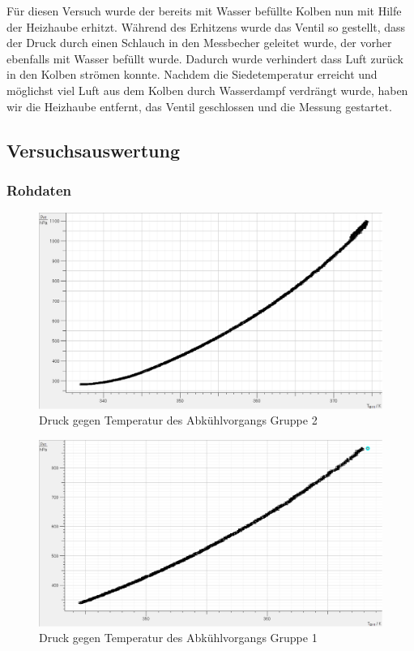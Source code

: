 \documentclass[12pt,a4paper]{article}
\begin{document}
Für diesen Versuch wurde der bereits mit Wasser befüllte Kolben nun mit Hilfe der Heizhaube erhitzt. Während des Erhitzens wurde das Ventil so gestellt, dass der Druck durch einen Schlauch in den Messbecher geleitet wurde, der vorher ebenfalls mit Wasser befüllt wurde. Dadurch wurde verhindert dass Luft zurück in den Kolben strömen konnte.
Nachdem die Siedetemperatur erreicht und möglichst viel Luft aus dem Kolben durch Wasserdampf verdrängt wurde, haben wir die Heizhaube entfernt, das Ventil geschlossen und die Messung gestartet.
\subsection{Versuchsauswertung}
\subsubsection{Rohdaten}
\begin{figure}[H]
\centering
\includegraphics[scale=0.5]{Bilder/RohdatenHaupmessungGrp2.png}
\caption{Druck gegen Temperatur des Abkühlvorgangs Gruppe 2}
\end{figure}
\begin{figure}[H]
\centering
\includegraphics[scale=0.5]{Bilder/RohdatenHaupmessungGrp11.png}
\caption{Druck gegen Temperatur des Abkühlvorgangs Gruppe 1}
\end{figure}
\end{document}

